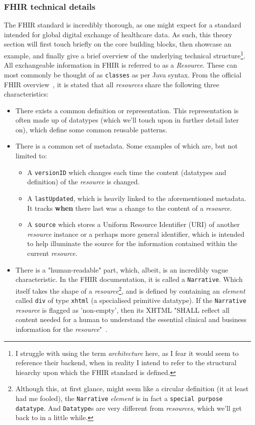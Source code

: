 \subsubsection*{FHIR technical details}
The FHIR standard is incredibly thorough, as one might expect for a standard intended for global digital exchange of healthcare data. As such, this theory section will first touch briefly on the core building blocks, then showcase an example, and finally give a brief overview of the underlying technical structure\footnote{I struggle with using the term \emph{architecture} here, as I fear it would seem to reference their backend, when in reality I intend to refer to the structural hiearchy upon which the FHIR standard is defined.}.
\\ 
All exchangeable information in FHIR is referred to as a \emph{Resource}. These can most commonly be thought of as \texttt{classes} as per Java syntax. From the official FHIR overview~\cite{FHIR-overview}, it is stated that all \emph{resources} share the following three characteristics:
\begin{itemize}
	\item There exists a common definition or representation. This representation is often made up of datatypes (which we'll touch upon in further detail later on), which define some common reusable patterns.
	\item There is a common set of metadata. Some examples of which are, but not limited to:
	\begin{itemize}
		\item A \texttt{versionID} which changes each time the content (datatypes and definition) of the \emph{resource} is changed.
		\item  A \texttt{lastUpdated}, which is heavily linked to the aforementioned metadata. It tracks \textbf{when} there last was a change to the content of a \emph{resource}.
		\item A \texttt{source} which stores a Uniform Resource Identifier (URI) of another \emph{resource} instance or a perhaps more general identifier, which is intended to help illuminate the source for the information contained within the current \emph{resource}. 
	\end{itemize}
	\item There is a "human-readable" part, which, albeit, is an incredibly vague characteristic. In the FHIR documentation, it is called a \texttt{Narrative}. Which itself takes the shape of a \emph{resource}\footnote{Although this, at first glance, might seem like a circular definition (it at least had me fooled), the \texttt{Narrative} \emph{element} is in fact a \texttt{special purpose datatype}. And \texttt{Datatype}s are very different from \emph{resources}, which we'll get back to in a little while.}, and is defined by containing an \emph{element} called \texttt{div} of type \texttt{xhtml} (a specialised primitive datatype). If the \texttt{Narrative} \emph{resource} is flagged as 'non-empty', then its XHTML "SHALL reflect all content needed for a human to understand the essential clinical and business information for the \emph{resource}"~\cite{FHIR-Narrative}.
\end{itemize}
